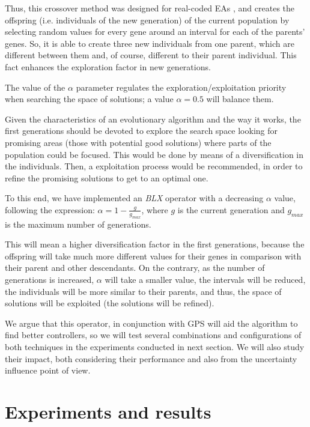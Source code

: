 \documentclass[10pt,journal,compsoc]{IEEEtran}
\begin{document}
Thus, this crossover method was designed for real-coded EAs \cite{blx2008}, and creates the offspring (i.e. individuals of the new generation) of the current population by selecting random values for every gene around an interval for each of the parents' genes. So, it is able to create three new individuals from one parent, which are different between them and, of course, different to their parent individual. This fact enhances the exploration factor in new generations.

The value of the $\alpha$ parameter regulates the exploration/exploitation priority when searching the space of solutions; a value $\alpha = 0.5$ will balance them.

Given the characteristics of an evolutionary algorithm and the way it works, the first generations should be devoted to explore the search space looking for promising areas (those with potential good solutions) where parts of the population could be focused. This would be done by means of a diversification in the individuals. Then, a exploitation process would be recommended, in order to refine the promising solutions to get to an optimal one.

To this end, we have implemented an \textit{BLX} operator with a decreasing $\alpha$ value, following
the expression: \mbox{$\alpha =1-\frac{g}{g_{max}}$}, where $g$ is the
current generation and $g_{max}$ is the maximum number of generations.

This will mean a higher diversification factor in the first generations, because the offspring will take much more different values for their genes in comparison with their parent and other descendants. %
On the contrary, as the number of generations is increased, $\alpha$ will take a smaller value, the intervals will be reduced, the individuals will be more similar to their parents, and thus, the space of solutions will be exploited (the solutions will be refined).

We argue that this operator, in conjunction with GPS will aid the
algorithm to find better controllers, so we will test several
combinations and configurations of both techniques in the experiments
conducted in next section. We will also study their impact, both considering their performance and also from the uncertainty influence point of view. 
\section{Experiments and results}  
\label{sec:results}
\end{document}
